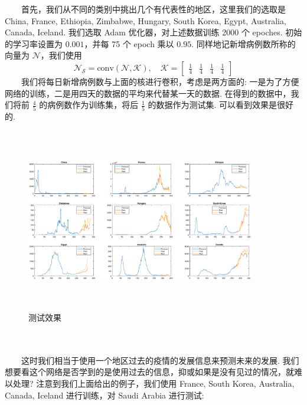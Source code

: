\documentclass[a4paper, titlepage]{article}
\begin{document}
    　　首先，我们从不同的类别中挑出几个有代表性的地区，这里我们的选取是 China, France, Ethiopia, Zimbabwe, Hungary, South Korea, Egypt, Australia, Canada, Iceland. 我们选取 Adam 优化器，对上述数据训练 2000 个 epoches. 初始的学习率设置为 $0.001$，并每 75 个 epoch 乘以 $0.95$. 同样地记新增病例数所称的向量为 $\mathcal{N}$，我们使用
	\[
		\mathcal{N}_{\mathcal{S}} = \text{conv}(\mathcal{N},\mathcal{K}), \quad \mathcal{K} = \begin{bmatrix}
			\displaystyle\frac{1}{4}&\displaystyle\frac{1}{4}&\displaystyle\frac{1}{4}&\displaystyle\frac{1}{4}
	\end{bmatrix}
	\]
	　　我们将每日新增病例数与上面的核进行卷积，考虑是两方面的: 一是为了方便网络的训练，二是用四天的数据的平均来代替某一天的数据.
	在得到的数据中，我们将前 $\frac{4}{5}$ 的病例数作为训练集，将后 $\frac{1}{5}$ 的数据作为测试集. 可以看到效果是很好的.\\
    \vspace{-1em}
    \begin{minipage}{\textwidth}
        \begin{figure}[H]
            \centering
	        \includegraphics[height=8cm, width=10cm]{./images/Chapter5/Pred.eps}
            \vspace{-1.5em}
            \caption{测试效果}
	\end{figure}
    \end{minipage}\\\quad\\
	　　这时我们相当于使用一个地区过去的疫情的发展信息来预测未来的发展. 我们想要看这个网络是否学到的是使用过去的信息，抑或如果是没有见过的情况，就难以处理? 注意到我们上面给出的例子，我们使用 France, South Korea, Australia, Canada, Iceland 进行训练，对 Saudi Arabia 进行测试:\\
\end{document}
